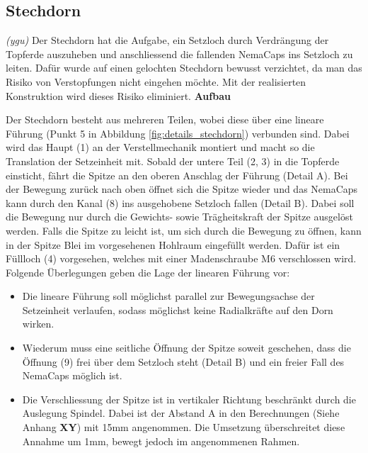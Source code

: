 \subsection{Stechdorn}
\textit{(ygu)} Der Stechdorn hat die Aufgabe, ein Setzloch durch Verdrängung der Topferde auszuheben und anschliessend die fallenden NemaCaps ins Setzloch zu leiten. Dafür wurde auf einen gelochten Stechdorn bewusst verzichtet, da man das Risiko von Verstopfungen nicht eingehen möchte. Mit der realisierten Konstruktion wird dieses Risiko eliminiert. 
\newline
\textbf{Aufbau}
\newline

Der Stechdorn besteht aus mehreren Teilen, wobei diese über eine lineare Führung (Punkt 5 in Abbildung \ref{fig:details_stechdorn}) verbunden sind. Dabei wird das Haupt (1) an der Verstellmechanik montiert und macht so die Translation der Setzeinheit mit. Sobald der untere Teil (2, 3) in die Topferde einsticht, fährt die Spitze an den oberen Anschlag der Führung (Detail A). Bei der Bewegung zurück nach oben öffnet sich die Spitze wieder und das NemaCaps kann durch den Kanal (8) ins ausgehobene Setzloch fallen (Detail B). Dabei soll die Bewegung nur durch die Gewichts- sowie Trägheitskraft der Spitze ausgelöst werden. Falls die Spitze zu leicht ist, um sich durch die Bewegung zu öffnen, kann in der Spitze Blei im vorgesehenen Hohlraum eingefüllt werden. Dafür ist ein Füllloch (4) vorgesehen, welches mit einer Madenschraube M6 verschlossen wird.
\newline
Folgende Überlegungen geben die Lage der linearen Führung vor:
\begin{itemize}
	\item Die lineare Führung soll möglichst parallel zur Bewegungsachse der Setzeinheit verlaufen, sodass möglichst keine Radialkräfte auf den Dorn wirken.
	
	\item Wiederum muss eine seitliche Öffnung der Spitze soweit geschehen, dass die Öffnung (9) frei über dem Setzloch steht (Detail B) und ein freier Fall des NemaCaps möglich ist.
	
	\item Die Verschliessung der Spitze ist in vertikaler Richtung beschränkt durch die Auslegung Spindel. Dabei ist der Abstand A in den Berechnungen (Siehe Anhang \textbf{XY}) mit 15mm angenommen. Die Umsetzung überschreitet diese Annahme um 1mm, bewegt jedoch im angenommenen Rahmen.
\end{itemize}

